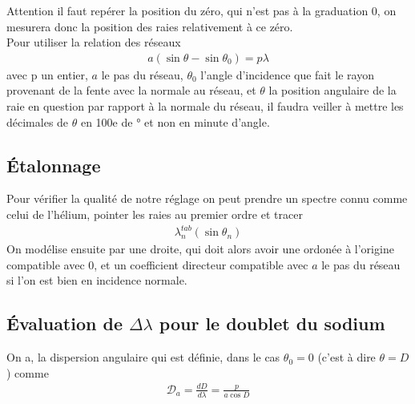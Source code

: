 \documentclass[12pt,prb,aps,epsf]{report}
\begin{document}
Attention il faut repérer la position du zéro, qui n'est pas à la graduation 0, on mesurera donc la position des raies relativement à ce zéro.\\

Pour utiliser la relation des réseaux 
\begin{eqnarray}
a(\sin\theta - \sin\theta_0) = p\lambda
\end{eqnarray}
avec p un entier, $a$ le pas du réseau, $\theta_0$ l'angle d'incidence que fait le rayon provenant de la fente avec la normale au réseau, et $\theta$ la position angulaire de la raie en question par rapport à la normale du réseau, il faudra veiller à mettre les décimales de $\theta$ en 100e de ° et non en minute d'angle.

\subsection{Étalonnage}
Pour vérifier la qualité de notre réglage on peut prendre un spectre connu comme celui de l'hélium, pointer les raies au premier ordre et tracer 
\begin{eqnarray}
\lambda_n^{tab}(\sin\theta_n)
\end{eqnarray}
On modélise ensuite par une droite, qui doit alors avoir une ordonée à l'origine compatible avec 0, et un coefficient directeur compatible avec $a$ le pas du réseau si l'on est bien en incidence normale.

\subsection{Évaluation de $\Delta\lambda$ pour le doublet du sodium}
On a, la dispersion angulaire qui est définie, dans le cas $\theta_0=0$ (c'est à dire $\theta=D$) comme 
\begin{eqnarray}
\mathcal{D}_a = \frac{dD}{d\lambda} = \frac{p}{a\cos D}
\end{eqnarray}
\end{document}
